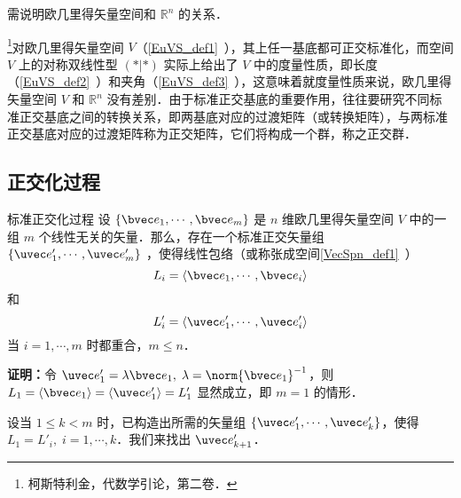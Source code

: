 
\begin{issues}
\issueTODO 需说明欧几里得矢量空间和 $\mathbb{R}^n$ 的关系．
\end{issues}

\footnote{柯斯特利金，代数学引论，第二卷．}对欧几里得矢量空间 $V$（\autoref{EuVS_def1}~），其上任一基底都可正交标准化，而空间 $V$ 上的对称双线性型 $(*|*)$ 实际上给出了 $V$ 中的度量性质，即长度（\autoref{EuVS_def2}~）和夹角（\autoref{EuVS_def3}~），这意味着就度量性质来说，欧几里得矢量空间 $V$ 和 $\mathbb{R}^n$ 没有差别．由于标准正交基底的重要作用，往往要研究不同标准正交基底之间的转换关系，即两基底对应的过渡矩阵（或转换矩阵），与两标准正交基底对应的过渡矩阵称为正交矩阵，它们将构成一个群，称之正交群．
\subsection{正交化过程}
\begin{theorem}{标准正交化过程}\label{EVOIOG_the1}
设 $\{\bvec e_1,\cdots,\bvec e_m\}$ 是 $n$ 维欧几里得矢量空间 $V$ 中的一组 $m$ 个线性无关的矢量．那么，存在一个标准正交矢量组 $\{\uvec e'_1,\cdots,\uvec e'_m\}$ ，使得线性包络（或称张成空间\autoref{VecSpn_def1}~）
\begin{equation}
L_i=\langle\bvec e_1,\cdots,\bvec e_i\rangle
\end{equation}
和
\begin{equation}
L'_i=\langle\uvec e'_1,\cdots,\uvec e'_i\rangle
\end{equation}
当 $i=1,\cdots,m$ 时都重合，$m\leq n$．
\end{theorem}
\textbf{证明：}令 $\uvec e'_1=\lambda\bvec e_1,\;\lambda=\norm{\bvec e_1}^{-1}$，则 $L_1=\langle\bvec e_1\rangle=\langle \uvec e'_1\rangle=L'_1$ 显然成立，即 $m=1$ 的情形．

设当 $1\leq k<m$ 时，已构造出所需的矢量组 $\{\uvec e'_1,\cdots,\uvec e'_k\}$，使得 $L_1=L'_i,\;i=1,\cdots,k$．我们来找出 $\uvec e'_{k+1}$．

